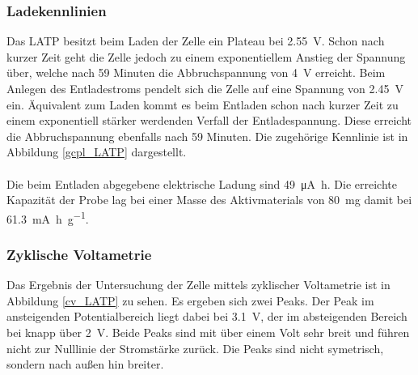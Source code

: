 \documentclass[a4paper, 11pt, headsepline,footsepline,twoside,abstract]{scrbook}
\begin{document}
\subsubsection{Ladekennlinien}
Das LATP besitzt beim Laden der Zelle ein Plateau bei \SI{2.55}{\volt}. Schon nach kurzer Zeit geht die Zelle jedoch zu einem exponentiellem Anstieg der Spannung über, welche nach 59 Minuten die Abbruchspannung von \SI{4}{\volt} erreicht. Beim Anlegen des Entladestroms pendelt sich die Zelle auf eine Spannung von \SI{2.45}{\volt} ein. Äquivalent zum Laden kommt es beim Entladen schon nach kurzer Zeit zu einem exponentiell stärker werdenden Verfall der Entladespannung. Diese erreicht die Abbruchspannung ebenfalls nach 59 Minuten. Die zugehörige Kennlinie ist in Abbildung \ref{gcpl_LATP} dargestellt. 
\\\\
Die beim Entladen abgegebene elektrische Ladung sind \SI{49}{\micro\ampere\hour}. Die erreichte Kapazität der Probe lag bei einer Masse des Aktivmaterials von \SI{80}{\milli\gram} damit bei \SI{61.3}{\milli\ampere\hour\per\gram}. 
\subsubsection{Zyklische Voltametrie}
Das Ergebnis der Untersuchung der Zelle mittels zyklischer Voltametrie ist in Abbildung \ref{cv_LATP} zu sehen. Es ergeben sich zwei Peaks. Der Peak im ansteigenden Potentialbereich liegt dabei bei \SI{3.1}{\volt}, der im absteigenden Bereich bei knapp über \SI{2}{\volt}. Beide Peaks sind mit über einem Volt sehr breit und führen nicht zur Nulllinie der Stromstärke zurück. Die Peaks sind nicht symetrisch, sondern nach außen hin breiter.
\end{document}

